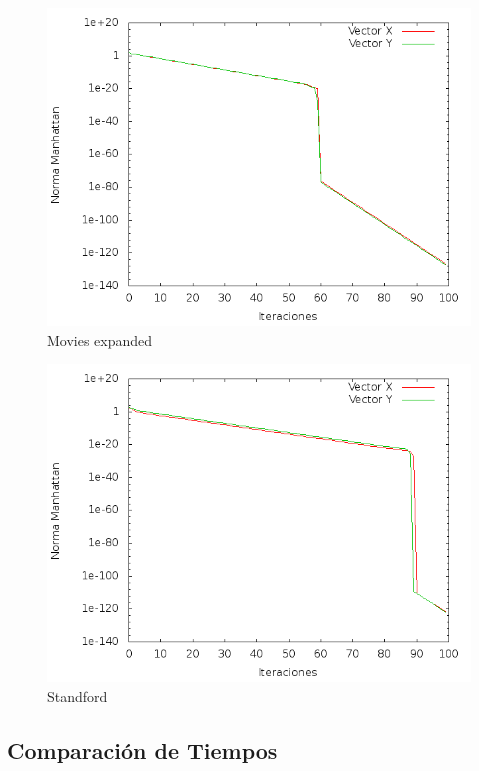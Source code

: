 \begin{figure}[!htb]
\begin{center}
    \includegraphics[scale=0.5]{imagenes/hits-movie.png}
    \caption{Movies expanded }
  \end{center}
\end{figure}
\begin{figure}[!htb]
\begin{center}
    \includegraphics[scale=0.5]{imagenes/hits-stadfor.png}
    \caption{Standford}
    \end{center}
\end{figure}

\subsection{Comparación de Tiempos}

